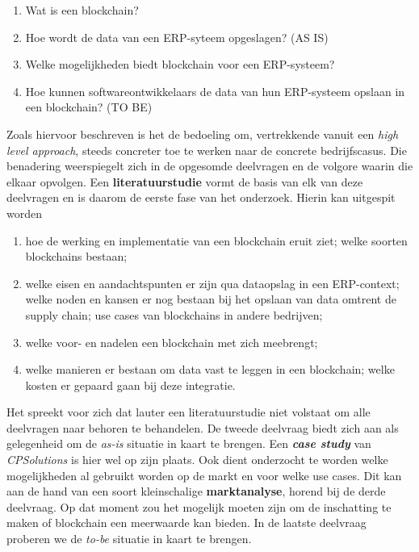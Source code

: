 \begin{enumerate}
	\item Wat is een blockchain?
	\item Hoe wordt de data van een ERP-syteem opgeslagen? (AS IS)
	\item Welke mogelijkheden biedt blockchain voor een ERP-systeem?
	\item Hoe kunnen softwareontwikkelaars de data van hun ERP-systeem opslaan in een blockchain? (TO BE)
	
\end{enumerate}

Zoals hiervoor beschreven is het de bedoeling om, vertrekkende vanuit een \textit{high level approach}, steeds concreter toe te werken naar de concrete bedrijfscasus. Die benadering weerspiegelt zich in de opgesomde deelvragen en de volgore waarin die elkaar opvolgen. Een \textbf{literatuurstudie} vormt de basis van elk van deze deelvragen en is daarom de eerste fase van het onderzoek. Hierin kan uitgespit worden
\begin{enumerate}
	\item hoe de werking en implementatie van een blockchain eruit ziet; welke soorten blockchains bestaan;
	\item welke eisen en aandachtspunten er zijn qua dataopslag in een ERP-context; welke noden en kansen er nog bestaan bij het opslaan van data omtrent de supply chain; use cases van blockchains in andere bedrijven;
	\item welke voor- en nadelen een blockchain met zich meebrengt; 
	\item welke manieren er bestaan om data vast te leggen in een blockchain; welke kosten er gepaard gaan bij deze integratie.
\end{enumerate}

Het spreekt voor zich dat lauter een literatuurstudie niet volstaat om alle deelvragen naar behoren te behandelen. 
De tweede deelvraag biedt zich aan als gelegenheid om de \textit{as-is} situatie in kaart te brengen. Een \textbf{\textit{case study}} van \textit{CPSolutions} is hier wel op zijn plaats. Ook dient onderzocht te worden welke mogelijkheden al gebruikt worden op de markt en voor welke use cases. Dit kan aan de hand van een soort kleinschalige \textbf{marktanalyse}, horend bij de derde deelvraag. Op dat moment zou het mogelijk moeten zijn om de inschatting te maken of blockchain een meerwaarde kan bieden. In de laatste deelvraag proberen we de \textit{to-be} situatie in kaart te brengen.


